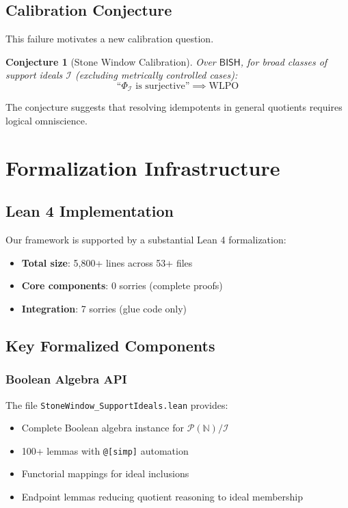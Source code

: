 \documentclass[11pt]{article}
\newtheorem{conjecture}[theorem]{Conjecture}
\newcommand{\N}{\mathbb{N}}
\newcommand{\WLPO}{\mathrm{WLPO}}
\newcommand{\BISH}{\mathsf{BISH}}
\begin{document}
\subsection{Calibration Conjecture}

This failure motivates a new calibration question.

\begin{conjecture}[Stone Window Calibration]\label{conj:stone}
Over $\BISH$, for broad classes of support ideals $\mathcal{I}$ (excluding metrically controlled cases):
\[
\text{``}\Phi_{\mathcal{I}} \text{ is surjective''} \implies \WLPO
\]
\end{conjecture}

The conjecture suggests that resolving idempotents in general quotients requires logical omniscience.

\section{Formalization Infrastructure}

\subsection{Lean 4 Implementation}

Our framework is supported by a substantial Lean 4 formalization:

\begin{itemize}
\item \textbf{Total size}: 5,800+ lines across 53+ files
\item \textbf{Core components}: 0 sorries (complete proofs)
\item \textbf{Integration}: 7 sorries (glue code only)
\end{itemize}

\subsection{Key Formalized Components}

\subsubsection{Boolean Algebra API}

The file \texttt{StoneWindow\_SupportIdeals.lean} provides:
\begin{itemize}
\item Complete Boolean algebra instance for $\mathcal{P}(\N)/\mathcal{I}$
\item 100+ lemmas with \texttt{@[simp]} automation
\item Functorial mappings for ideal inclusions
\item Endpoint lemmas reducing quotient reasoning to ideal membership
\end{itemize}
\end{document}
